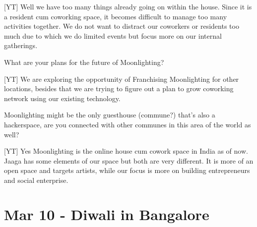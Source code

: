 \documentclass[11pt]{amsart}
\begin{document}
[YT] Well we have too many things already going on within the house. Since it is a resident cum coworking space, it becomes difficult to manage too many activities together. We do not want to distract our coworkers or residents too much due to which we do limited events but focus more on our internal gatherings.

What are your plans for the future of Moonlighting?

[YT] We are exploring the opportunity of Franchising Moonlighting for other locations, besides that we are trying to figure out a plan to grow coworking network using our existing technology.

Moonlighting might be the only guesthouse (commune?) that's also a hackerspace, are you connected with other communes in this area of the world as well?

[YT] Yes Moonlighting is the online house cum cowork space in India as of now. Jaaga has some elements of our space but both are very different. It is more of an open space and targets artists, while our focus is more on building entrepreneurs and social enterprise.

\section{Mar 10 - Diwali in Bangalore}
\end{document}
